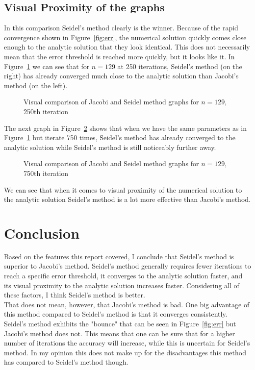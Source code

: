 \documentclass[a4paper,12pt,reqno]{article}
\newcommand{\figref}[1]{Figure~\ref{#1}}
\begin{document}
\subsection{Visual Proximity of the graphs}

In this comparison Seidel's method clearly is the winner. Because of the rapid
convergence shown in \figref{fig:err}, the numerical solution quickly comes 
close enough to the analytic solution that they look identical. This does not
necessarily mean that the error threshold is reached more quickly, but it looks
like it. In \figref{fig:vis1} we can see that for $n=129$ at 250 iterations, 
Seidel's method (on the right) has already converged much close to the analytic 
solution than Jacobi's method (on the left).
\begin{figure}[H]
    \center
    \hspace{3pt}
    \caption{Visual comparison of Jacobi and Seidel method graphs for $n=129$,
    250th iteration}
    \label{fig:vis1}
\end{figure}
\noindent
The next graph in \figref{fig:vis2} shows that when we have the same parameters
as in \figref{fig:vis1} but iterate 750 times, Seidel's method has already
converged to the analytic solution while Seidel's method is still noticeably
further away.
\begin{figure}[H]
    \center
    \hspace{3pt}
    \caption{Visual comparison of Jacobi and Seidel method graphs for $n=129$,
    750th iteration}
    \label{fig:vis2}
\end{figure}
\noindent
We can see that when it comes to visual proximity of the numerical solution to
the analytic solution Seidel's method is a lot more effective than Jacobi's
method.

\section{Conclusion}

Based on the features this report covered, I conclude that Seidel's method is
superior to Jacobi's method. Seidel's method generally requires fewer
iterations to reach a specific error threshold, it converges to the analytic
solution faster, and its visual proximity to the analytic solution increases
faster. Considering all of these factors, I think Seidel's method is better.\\
That does not mean, however, that Jacobi's method is bad. One big advantage of
this method compared to Seidel's method is that it converges consistently.
Seidel's method exhibits the "bounce" that can be seen in \figref{fig:err} but
Jacobi's method does not. This means that one can be sure that for a higher
number of iterations the accuracy will increase, while this is uncertain for
Seidel's method. In my opinion this does not make up for the 
disadvantages this method has compared to Seidel's method though.
\end{document}
